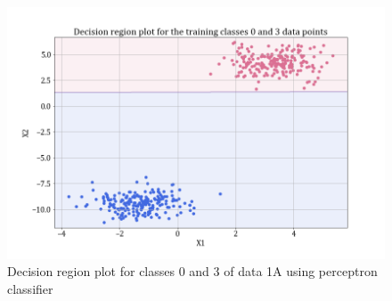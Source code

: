\documentclass[11pt,a4paper]{article}
\begin{document}
\begin{figure}[H]
    \centering
    \includegraphics[scale = 0.35]{images/training classes 0 and 3dec_reg_perceptron.png}
    \caption{Decision region plot for classes 0 and 3 of data 1A using perceptron classifier}
    \label{fig:perc_dec_reg_03}
\end{figure}
\end{document}
